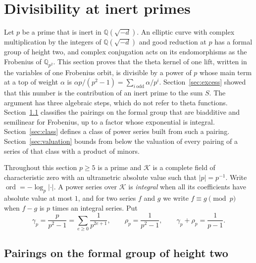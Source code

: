\section{Divisibility at inert primes}\label{sec:gain}

Let $p$ be a prime that is inert in $\mathbb Q(\sqrt{-d})$. An elliptic curve with complex multiplication by the integers of $\mathbb Q(\sqrt{-d})$ and good reduction at $p$ has a formal group of height two, and complex conjugation acts on its endomorphisms as the Frobenius of $\mathbb Q_{p^2}$. This section proves that the theta kernel of one lift, written in the variables of one Frobenius orbit, is divisible by a power of $p$ whose main term at a top of weight $\alpha$ is $\alpha p/(p^2-1)=\sum_{i\ \mathrm{odd}}\alpha/p^i$. Section~\ref{sec:excess} showed that this number is the contribution of an inert prime to the sum $S$. The argument has three algebraic steps, which do not refer to theta functions. Section~\ref{sec:pairings} classifies the pairings on the formal group that are biadditive and semilinear for Frobenius, up to a factor whose exponential is integral. Section~\ref{sec:class} defines a class of power series built from such a pairing. Section~\ref{sec:valuation} bounds from below the valuation of every pairing of a series of that class with a product of minors.

Throughout this section $p\ge5$ is a prime and $\mathcal K$ is a complete field of characteristic zero with an ultrametric absolute value such that $\lvert p\rvert=p^{-1}$. Write $\operatorname{ord}=-\log_p\lvert\cdot\rvert$. A power series over $\mathcal K$ is \emph{integral} when all its coefficients have absolute value at most $1$, and for two series $f$ and $g$ we write $f\equiv g\pmod p$ when $f-g$ is $p$ times an integral series. Put
\[
\gamma_p=\frac p{p^2-1}=\sum_{e\ge0}\frac1{p^{2e+1}},\qquad\rho_p=\frac1{p^2-1},\qquad\gamma_p+\rho_p=\frac1{p-1}.
\]

\subsection{Pairings on the formal group of height two}\label{sec:pairings}

